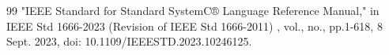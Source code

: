 
\begin{thebibliography}{99}
     "IEEE Standard for Standard SystemC® Language Reference Manual," in IEEE Std 1666-2023 (Revision of IEEE Std 1666-2011) , vol., no., pp.1-618, 8 Sept. 2023, doi: 10.1109/IEEESTD.2023.10246125.
\end{thebibliography}
